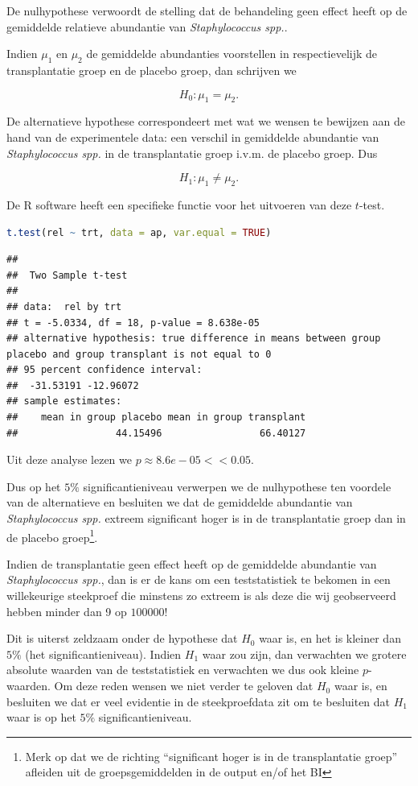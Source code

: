 \documentclass[
  12pt,dutch,coursenotes]{book}
\begin{document}
De nulhypothese verwoordt de stelling dat de behandeling geen effect heeft op de gemiddelde relatieve abundantie van \emph{Staphylococcus spp.}.

Indien \(\mu_1\) en \(\mu_2\) de gemiddelde abundanties voorstellen in respectievelijk de transplantatie groep en de placebo groep, dan schrijven we

\[H_0: \mu_1=\mu_2.\]

De alternatieve hypothese correspondeert met wat we wensen te bewijzen aan de hand van de experimentele data: een verschil in gemiddelde abundantie van \emph{Staphylococcus spp.} in de transplantatie groep i.v.m. de placebo groep. Dus

\[H_1: \mu_1\neq \mu_2.\]

De R software heeft een specifieke functie voor het uitvoeren van deze \(t\)-test.

\begin{lstlisting}[language=R]
t.test(rel ~ trt, data = ap, var.equal = TRUE)
\end{lstlisting}

\begin{lstlisting}
## 
##  Two Sample t-test
## 
## data:  rel by trt
## t = -5.0334, df = 18, p-value = 8.638e-05
## alternative hypothesis: true difference in means between group placebo and group transplant is not equal to 0
## 95 percent confidence interval:
##  -31.53191 -12.96072
## sample estimates:
##    mean in group placebo mean in group transplant 
##                 44.15496                 66.40127
\end{lstlisting}

Uit deze analyse lezen we \(p\approx 8.6e-05<<0.05\).

Dus op het \(5\%\) significantieniveau verwerpen we de nulhypothese ten voordele van de alternatieve en besluiten we dat de gemiddelde abundantie van \emph{Staphylococcus spp.} extreem significant hoger is in de transplantatie groep dan in de placebo groep\footnote{Merk op dat we de richting ``significant hoger is in de transplantatie groep'' afleiden uit de groepsgemiddelden in de output en/of het BI}.

Indien de transplantatie geen effect heeft op de gemiddelde abundantie van \emph{Staphylococcus spp.}, dan is er de kans om een teststatistiek te bekomen in een willekeurige steekproef die minstens zo extreem is als deze die wij geobserveerd hebben minder dan 9 op \(100000\)!

Dit is uiterst zeldzaam onder de hypothese dat \(H_0\) waar is, en het is kleiner dan \(5\%\) (het significantieniveau). Indien \(H_1\) waar zou zijn, dan verwachten we grotere absolute waarden van de teststatistiek en verwachten we dus ook kleine \(p\)-waarden. Om deze reden wensen we niet verder te geloven dat \(H_0\) waar is, en besluiten we dat er veel evidentie in de steekproefdata zit om te besluiten dat \(H_1\) waar is op het \(5\%\) significantieniveau.
\end{document}
